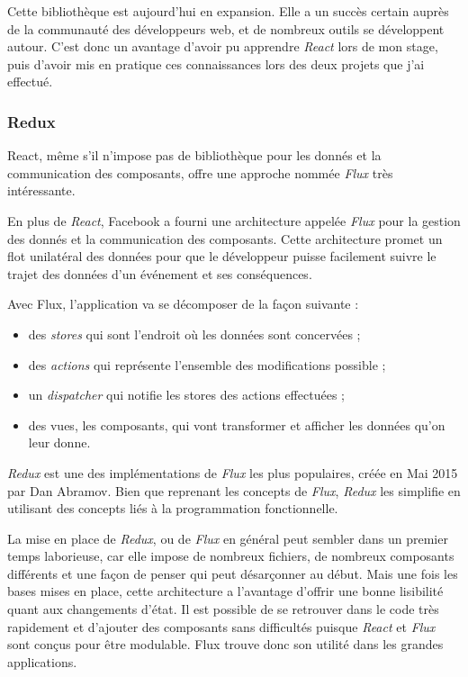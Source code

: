Cette bibliothèque est aujourd'hui en expansion. Elle a un succès
certain auprès de la communauté des développeurs web, et de nombreux
outils se développent autour. C'est donc un avantage d'avoir pu
apprendre \emph{React} lors de mon stage, puis d'avoir mis en pratique
ces connaissances lors des deux projets que j'ai effectué.

\bigskip

\subsubsection{Redux}\label{redux}

\bigskip

React, même s'il n'impose pas de bibliothèque pour les donnés et la
communication des composants, offre une approche nommée \emph{Flux} très
intéressante.

\bigskip

En plus de \emph{React}, Facebook a fourni une architecture appelée
\emph{Flux} pour la gestion des donnés et la communication des
composants. Cette architecture promet un flot unilatéral des données
pour que le développeur puisse facilement suivre le trajet des données
d'un événement et ses conséquences.

\bigskip

Avec Flux, l'application va se décomposer de la façon suivante :

\begin{itemize}
\tightlist
\item
  des \emph{stores} qui sont l'endroit où les données sont concervées ;
\item
  des \emph{actions} qui représente l'ensemble des modifications
  possible ;
\item
  un \emph{dispatcher} qui notifie les stores des actions effectuées ;
\item
  des vues, les composants, qui vont transformer et afficher les données
  qu'on leur donne.
\end{itemize}

\bigskip

\emph{Redux} est une des implémentations de \emph{Flux} les plus
populaires, créée en Mai 2015 par Dan Abramov. Bien que reprenant les
concepts de \emph{Flux}, \emph{Redux} les simplifie en utilisant des
concepts liés à la programmation fonctionnelle.

\bigskip

La mise en place de \emph{Redux}, ou de \emph{Flux} en général peut
sembler dans un premier temps laborieuse, car elle impose de nombreux
fichiers, de nombreux composants différents et une façon de penser qui
peut désarçonner au début. Mais une fois les bases mises en place, cette
architecture a l'avantage d'offrir une bonne lisibilité quant aux
changements d'état. Il est possible de se retrouver dans le code très
rapidement et d'ajouter des composants sans difficultés puisque
\emph{React} et \emph{Flux} sont conçus pour être modulable. Flux trouve
donc son utilité dans les grandes applications.

